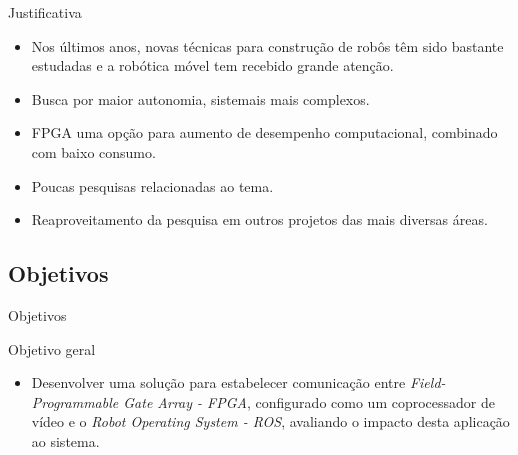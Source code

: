 \documentclass[10pt]{beamer}
\begin{document}
\begin{frame}[fragile]{Justificativa}
    \begin{itemize}
        \item Nos últimos anos, novas técnicas para construção de robôs têm sido bastante estudadas e a robótica móvel tem recebido grande atenção.
        \item Busca por maior autonomia, sistemais mais complexos.
        \item FPGA uma opção para aumento de desempenho computacional, combinado com baixo consumo.
        \item Poucas pesquisas relacionadas ao tema.
        \item Reaproveitamento da pesquisa em outros projetos das mais diversas áreas.
    \end{itemize}
\end{frame}




\subsection{Objetivos}
{
\begin{frame}{Objetivos}
    \begin{alertblock}{Objetivo geral}
    	\begin{itemize}
    	\item Desenvolver uma solução para estabelecer comunicação entre \textit{Field-Programmable Gate Array - FPGA}, configurado como um coprocessador de vídeo e o \textit{Robot Operating System - ROS}, avaliando o impacto desta aplicação ao sistema.
    	\end{itemize}
    \end{alertblock}
\end{frame}
}
\end{document}
